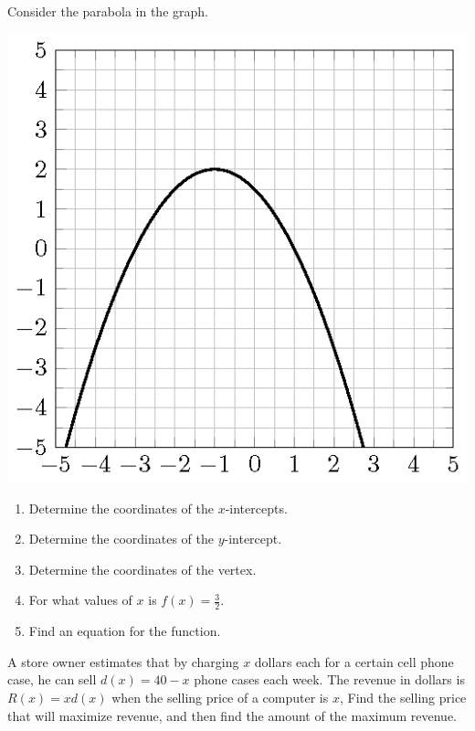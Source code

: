 \begin{exercise}

Consider the parabola in the graph.

\includegraphics{figs/tikz-exercise-graph-quadratic-2.png}

\begin{enumerate}
\item
  Determine the coordinates of the \(x\)-intercepts.
\item
  Determine the coordinates of the \(y\)-intercept.
\item
  Determine the coordinates of the vertex.
\item
  For what values of \(x\) is \(f(x)=\frac{3}{2}\).
\item
  Find an equation for the function.
\end{enumerate}

\end{exercise}

\begin{exercise}

A store owner estimates that by charging \(x\) dollars each for a
certain cell phone case, he can sell \(d(x)=40 - x\) phone cases each
week. The revenue in dollars is \(R(x)=xd(x)\) when the selling price of
a computer is \(x\), Find the selling price that will maximize revenue,
and then find the amount of the maximum revenue.

\end{exercise}
\vspace*{6\baselineskip}

